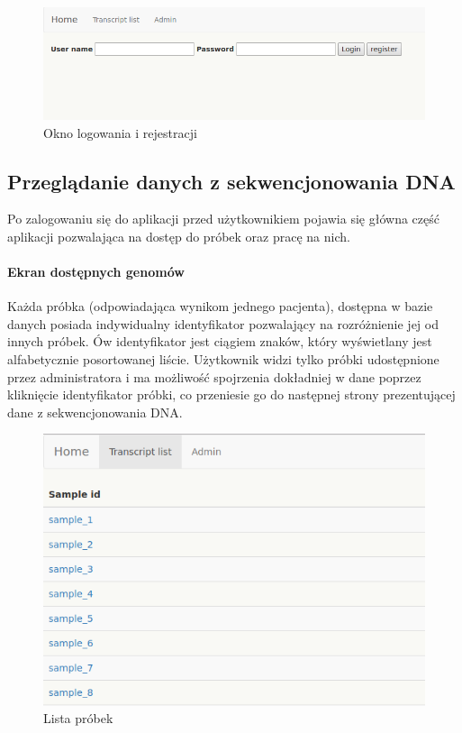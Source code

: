 \documentclass[a4paper,12pt,twoside]{article}
\begin{document}
\begin{figure}[h!]
\includegraphics[width=\linewidth]{obrazy/aplikacja/login.png}
\caption{Okno logowania i rejestracji}
\label{fig:loginpic}
\end{figure}

\newpage
\subsection{Przeglądanie danych z sekwencjonowania DNA} \label{sssec:dnaPage}
Po zalogowaniu się do aplikacji przed użytkownikiem pojawia się główna część aplikacji pozwalająca na dostęp do próbek oraz pracę na nich.

\paragraph{Ekran dostępnych genomów}
Każda próbka (odpowiadająca wynikom jednego pacjenta), dostępna w bazie danych posiada indywidualny identyfikator pozwalający na
rozróżnienie jej od innych próbek. Ów identyfikator jest ciągiem znaków, który wyświetlany jest
alfabetycznie posortowanej liście. Użytkownik widzi tylko próbki udostępnione przez administratora
i ma możliwość spojrzenia dokładniej w dane poprzez kliknięcie identyfikator próbki,
co przeniesie go do następnej strony prezentującej dane z sekwencjonowania DNA.

\begin{figure}[h!]
\includegraphics[width=\linewidth]{obrazy/aplikacja/sample_list.png}
\caption{Lista próbek}
\label{fig:sample_listpic}
\end{figure}
\end{document}
